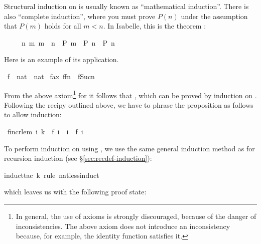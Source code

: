 \begin{isabellebody}
\begin{isamarkuptext}
Structural induction on  is
usually known as ``mathematical induction''. There is also ``complete
induction'', where you must prove $P(n)$ under the assumption that $P(m)$
holds for all $m<n$. In Isabelle, this is the theorem :
\begin{isabelle}%
\ \ \ \ \ {\isacharparenleft}{\isasymAnd}n{\isachardot}\ {\isasymforall}m{\isachardot}\ m\ {\isacharless}\ n\ {\isasymlongrightarrow}\ P\ m\ {\isasymLongrightarrow}\ P\ n{\isacharparenright}\ {\isasymLongrightarrow}\ P\ n%
\end{isabelle}
Here is an example of its application.%
\end{isamarkuptext}%
\ f\ {\isacharcolon}{\isacharcolon}\ {\isachardoublequote}nat\ {\isacharequal}{\isachargreater}\ nat{\isachardoublequote}\isanewline
{}\ f{\isacharunderscore}ax{\isacharcolon}\ {\isachardoublequote}f{\isacharparenleft}f{\isacharparenleft}n{\isacharparenright}{\isacharparenright}\ {\isacharless}\ f{\isacharparenleft}Suc{\isacharparenleft}n{\isacharparenright}{\isacharparenright}{\isachardoublequote}%
\begin{isamarkuptext}%
\noindent
From the above axiom\footnote{In general, the use of axioms is strongly
discouraged, because of the danger of inconsistencies. The above axiom does
not introduce an inconsistency because, for example, the identity function
satisfies it.}
for  it follows that , which can
be proved by induction on . Following the recipy outlined
above, we have to phrase the proposition as follows to allow induction:%
\end{isamarkuptext}%
\ f{\isacharunderscore}incr{\isacharunderscore}lem{\isacharcolon}\ {\isachardoublequote}{\isasymforall}i{\isachardot}\ k\ {\isacharequal}\ f\ i\ {\isasymlongrightarrow}\ i\ {\isasymle}\ f\ i{\isachardoublequote}%
\begin{isamarkuptxt}%
\noindent
To perform induction on  using , we use the same
general induction method as for recursion induction (see
\S\ref{sec:recdef-induction}):%
\end{isamarkuptxt}%
induct{\isacharunderscore}tac\ k\ rule{\isacharcolon}\ nat{\isacharunderscore}less{\isacharunderscore}induct{\isacharparenright}%
\begin{isamarkuptxt}%
\noindent
which leaves us with the following proof state:

\end{isamarkuptxt}
\end{isabellebody}
